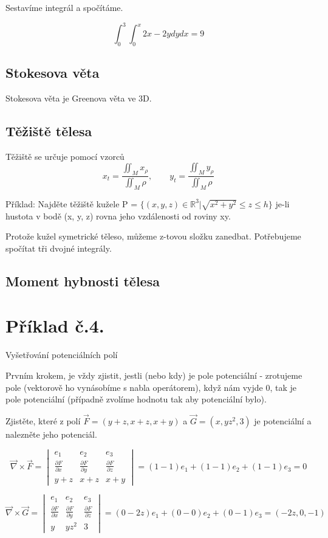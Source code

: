 \documentclass[12pt, letterpaper]{article}
\begin{document}
Sestavíme integrál a spočítáme.

\[\int_0^3 \int_0^x 2x - 2y  dy dx = 9\]

\subsection*{Stokesova věta}
Stokesova věta je Greenova věta ve 3D.
\subsection*{Těžiště tělesa}
Těžiště se určuje pomocí vzorců
\[x_t = \frac{\iint_M x_\rho}{\iint_M \rho}, \qquad y_t = \frac{\iint_M y_\rho}{\iint_M \rho}\]

Příklad: Najděte těžiště kužele P = $ \{ (x, y, z) \in  \mathbb{R}^3 | \sqrt{x^2 + y^2} \leq z \leq h \} $ je-li hustota v bodě (x, y, z) rovna jeho vzdálenosti od roviny xy.

Protože kužel symetrické těleso, můžeme z-tovou složku zanedbat. Potřebujeme spočítat tři dvojné integrály.

\subsection*{Moment hybnosti tělesa}

\section*{Příklad č.4.}

Vyšetřování potenciálních polí

Prvním krokem, je vždy zjistit, jestli (nebo kdy) je pole potenciální - zrotujeme pole (vektorově ho vynásobíme s nabla operátorem), když nám vyjde 0, tak je pole potenciální (případně zvolíme hodnotu tak aby potenciální bylo).

Zjistěte, které z polí $\vec{F} = (y + z, x + z, x + y)$ a $\vec{G} = (x, yz^2, 3)$ je potenciální a nalezněte jeho potenciál.


\[\vec{\nabla} \times \vec{F} = \begin{vmatrix} e_1 & e_2 & e_3 \\
\frac{\partial F}{\partial x} & \frac{\partial F}{\partial y} & \frac{\partial F}{\partial z} \\ 
y + z & x + z &  x + y\end{vmatrix} = (1-1)e_1 + (1-1)e_2 + (1-1)e_3 = 0\]

\[\vec{\nabla} \times \vec{G} = \begin{vmatrix} e_1 & e_2 & e_3 \\
\frac{\partial F}{\partial x} & \frac{\partial F}{\partial y} & \frac{\partial F}{\partial z} \\ 
y & yz^2 &  3\end{vmatrix} = (0-2z)e_1 + (0-0)e_2 + (0-1)e_3 = (-2z, 0, -1)\]
\end{document}
